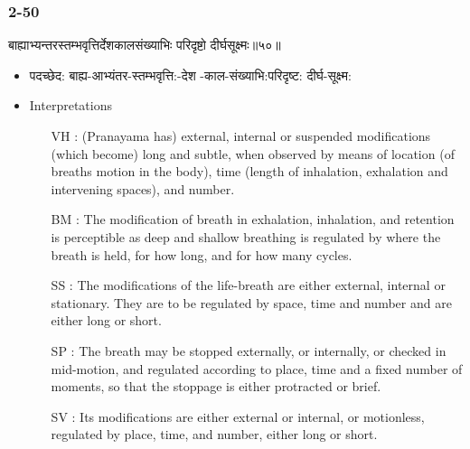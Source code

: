 \begin{frame}[fragile]\frametitle{2-50}
\begin{sanskrit}
बाह्याभ्यन्तरस्तम्भवृत्तिर्देशकालसंख्याभिः परिदृष्टो दीर्घसूक्ष्मः॥५०॥
\end{sanskrit}

	\begin{itemize}
	\item पदच्छेद: बाह्य-आभ्यंतर-स्तम्भवृत्ति:-देश -काल-संख्याभि:परिदृष्ट: दीर्घ-सूक्ष्म:
	\item Interpretations
		\begin{itemize}
		\item [VH]: (Pranayama has) external, internal or suspended modifications (which become) long and subtle, when observed by means of location (of breaths motion in the body), time (length of inhalation, exhalation and intervening spaces), and number.
		\item [BM]: The modification of breath in exhalation, inhalation, and retention is perceptible as deep and shallow breathing is regulated by where the breath is held, for how long, and for how many cycles.
		\item [SS]: The modifications of the life-breath are either external, internal or stationary. They are to be regulated by space, time and number and are either long or short.
		\item [SP]: The breath may be stopped externally, or internally, or checked in mid-motion, and regulated according to place, time and a fixed number of moments, so that the stoppage is either protracted or brief.
		\item [SV]: Its modifications are either external or internal, or motionless, regulated by place, time, and number, either long or short. 
		\end{itemize}
	\end{itemize}	
\end{frame}




